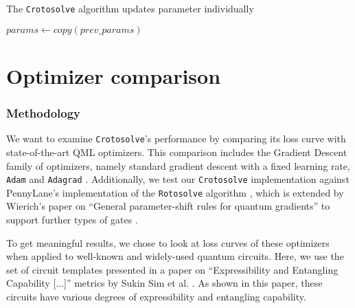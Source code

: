 \begin{algorithm}
    \caption{The \texttt{Crotosolve} algorithm updates parameter individually}
    \label{alg:crotosolve}
    \BlankLine
    $params \gets copy(prev\_params)$\;
\end{algorithm}

\section{Optimizer comparison}
\label{sec:optimizer-comparison}
\subsubsection*{Methodology}

We want to examine \texttt{Crotosolve}'s performance by comparing its loss curve
with state-of-the-art QML optimizers.
This comparison includes the Gradient Descent family of optimizers, namely
standard gradient descent with a fixed learning rate, %
\texttt{Adam} \cite{kingma_adam_2017} and
\texttt{Adagrad} \cite{duchi_adaptive_2011}.
Additionally, we test our \texttt{Crotosolve} implementation against PennyLane's
implementation of the \texttt{Rotosolve} algorithm
\cite{ostaszewski_structure_2021,bergholm_pennylane_2022}, which is extended by
Wierich's paper on ``General parameter-shift rules for quantum gradients'' to
support further types of gates \cite{wierichs_general_2022}.

To get meaningful results, we chose to look at loss curves of these optimizers
when applied to well-known and widely-used quantum circuits.
Here, we use the set of circuit templates presented in a paper on
``Expressibility and Entangling Capability [...]'' metrics by Sukin Sim et al.
\cite{sim_expressibility_2019}.
As shown in this paper, these circuits have various degrees of expressibility
and entangling capability. %

